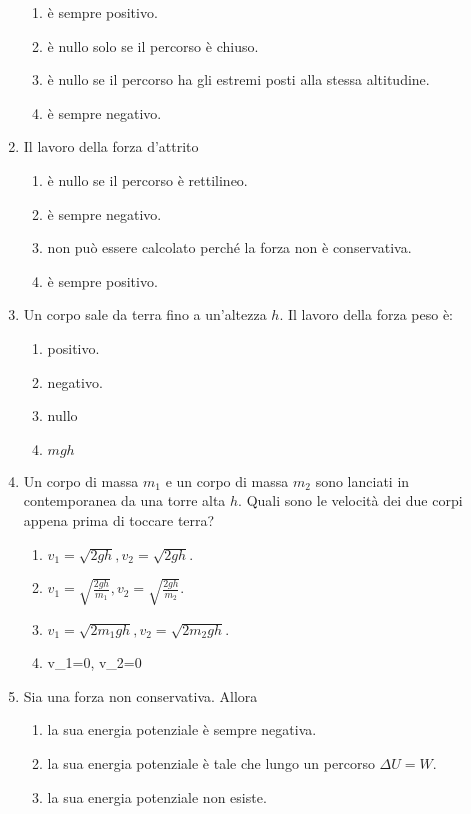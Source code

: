 \documentclass{article}
\begin{document}
\begin{enumerate}
  \begin{enumerate}[label=\Alph*.]
    \item è sempre positivo.
    \item è nullo solo se il percorso è chiuso.
    \item è nullo se il percorso ha gli estremi posti alla stessa altitudine.
    \item è sempre negativo.
  \end{enumerate}
  \item Il lavoro della forza d'attrito
  \begin{enumerate}[label=\Alph*.]
    \item è nullo se il percorso è rettilineo.
    \item è sempre negativo.
    \item non può essere calcolato perché la forza non è conservativa.
    \item è sempre positivo.
  \end{enumerate}
  \item Un corpo sale da terra fino a un'altezza $h$. Il lavoro della forza peso è:
  \begin{enumerate}[label=\Alph*.]
    \item positivo.
    \item negativo.
    \item nullo
    \item $mgh$
  \end{enumerate}
  \item Un corpo di massa $m_1$ e un corpo di massa $m_2$ sono lanciati in contemporanea da una torre alta $h$. Quali sono le velocità dei due corpi appena prima di toccare terra?
  \begin{enumerate}[label=\Alph*.]
    \item $v_1=\sqrt{2gh}, v_2=\sqrt{2gh}$.
    \item $v_1=\sqrt{\frac{2gh}{m_1}}, v_2=\sqrt{\frac{2gh}{m_2}}$.
    \item $v_1=\sqrt{2m_1gh}, v_2=\sqrt{2m_2gh}$.
    \item v_1=0, v_2=0
  \end{enumerate}
  \item Sia  una forza non conservativa. Allora
  \begin{enumerate}[label=\Alph*.]
    \item la sua energia potenziale è sempre negativa.
    \item la sua energia potenziale è tale che lungo un percorso $\Delta U=W$.
    \item la sua energia potenziale non esiste.

\end{enumerate}
\end{enumerate}
\end{document}
